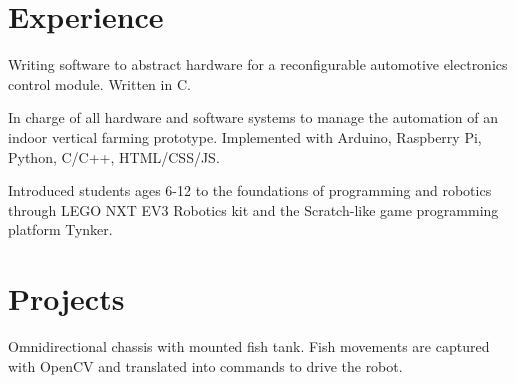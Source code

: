 \documentclass[]{deedy-resume-openfont}
\begin{document}
\begin{minipage}[t]{0.66\textwidth} 


\section{Experience}
\vspace{\topsep} %
\begin{tightemize}
\item Writing software to abstract hardware for a reconfigurable automotive electronics control module. Written in C.
\end{tightemize}
\sectionsep

\vspace{\topsep} %
\begin{tightemize}
\item In charge of all hardware and software systems to manage the
automation of an indoor vertical farming prototype. Implemented
with Arduino, Raspberry Pi, Python, C/C++, HTML/CSS/JS.
\end{tightemize}
\sectionsep

\begin{tightemize}
\item Introduced students ages 6-12 to the foundations of programming
and robotics through LEGO NXT EV3 Robotics kit and the Scratch-like
game programming platform Tynker.
\end{tightemize}
\sectionsep


\section{Projects}
\begin{tightemize}
\item Omnidirectional chassis with mounted fish tank. Fish movements are
captured with OpenCV and translated into commands to drive the robot.
\end{tightemize}
\sectionsep


\end{minipage}
\end{document}
